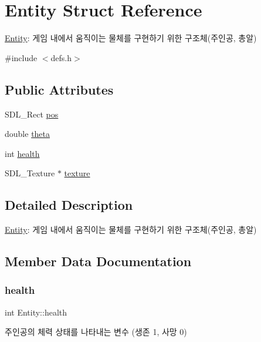 \hypertarget{struct_entity}{}\section{Entity Struct Reference}
\label{struct_entity}


\hyperlink{struct_entity}{Entity}\+: 게임 내에서 움직이는 물체를 구현하기 위한 구조체(주인공, 총알)  




{\ttfamily \#include $<$defs.\+h$>$}

\subsection*{Public Attributes}
\begin{DoxyCompactItemize}
\item 
S\+D\+L\+\_\+\+Rect \hyperlink{struct_entity_a6d76b33d9bd8ca3323e8d62dfac72481}{pos}
\item 
double \hyperlink{struct_entity_a2e774bbee1f449ee3bfacd06880c1566}{theta}
\item 
int \hyperlink{struct_entity_ab5bf0c97620636e04b271601e2133884}{health}
\item 
S\+D\+L\+\_\+\+Texture $\ast$ \hyperlink{struct_entity_a7e3a5bd3ee8f06d2641b183b4ea87933}{texture}
\end{DoxyCompactItemize}


\subsection{Detailed Description}
\hyperlink{struct_entity}{Entity}\+: 게임 내에서 움직이는 물체를 구현하기 위한 구조체(주인공, 총알) 

\subsection{Member Data Documentation}
\mbox{\label{struct_entity_ab5bf0c97620636e04b271601e2133884}} 
\subsubsection{\texorpdfstring{health}{health}}
{\footnotesize\ttfamily int Entity\+::health}

주인공의 체력 상태를 나타내는 변수 (생존 1, 사망 0) \mbox{\label{struct_entity_a6d76b33d9bd8ca3323e8d62dfac72481}} 
